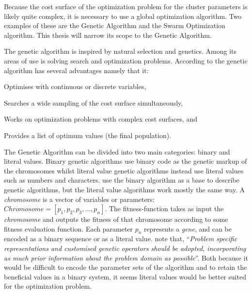Because the cost surface of the optimization problem for the \CTC cluster parameters is likely quite complex, it is necessary to use a global optimization algorithm. Two examples of these are the Genetic Algorithm and the Swarm Optimization algorithm. This thesis will narrow its scope to the Genetic Algorithm.

The genetic algorithm is inspired by natural selection and genetics. Among its areas of use is solving search and optimization problems. According to \citeauthor[23]{Haupt2004} the genetic algorithm has several advantages namely that it:
\begin{inparaenum}[\itshape 1\upshape)]
\item Optimises with continuous or discrete variables,
\item Searches a wide sampling of the cost surface simultaneously,
\item Works on optimization problems with complex cost surfaces, and
\item Provides a list of optimum values (the final population).
\end{inparaenum}

The Genetic Algorithm can be divided into two main categories: binary and literal values. Binary genetic algorithms use binary code as the genetic markup of the chromosomes whilst literal value genetic algorithms instead use literal values such as numbers and characters. \citeauthor{Haupt2004a} use the binary algorithm as a base to describe genetic algorithms, but the literal value algorithms work mostly the same way. A \textit{chromosome} is a vector of variables or parameters: \(Chromosome = [p_{1},p_{2},p_{3},\dots,p_{n}]\). The fitness-function takes as input the \textit{chromosome} and outputs the fitness of that chromosome according to some fitness evaluation function. Each parameter \(p_{n}\) represents a \textit{gene}, and can be encoded as a binary sequence or as a literal value. \citeauthor[p. 93]{Brownlee2011} note that, ``\textit{Problem specific representations and customised genetic operators should be adopted, incorporating as much prior information about the problem domain as possible}''. Both because it would be difficult to encode the parameter sets of the \CTC algorithm and to retain the beneficial values in a binary system, it seems literal values would be better suited for the optimization problem.

